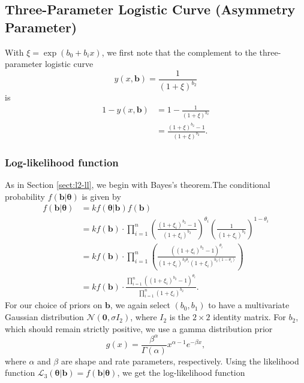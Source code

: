 \documentclass[11pt, letterpaper]{article}
\newcommand{\mc}[1]{\mathcal{#1}}
\numberwithin{equation}{section}
\begin{document}
\subsection{Three-Parameter Logistic Curve (Asymmetry Parameter)}
With $\xi = \exp(b_0 + b_i x)$, we first note that the complement to the three-parameter logistic curve $$y(x, \bm b) = \frac{1}{(1+\xi)^{b_2}} $$ is 
\begin{align*}
1 - y(x, \bm b) & = 1- \frac{1}{(1+\xi)^{b_2}} \\
& = \frac{(1+\xi)^{b_2} -1}{(1+\xi)^{b_2}}.
\end{align*}

\subsubsection{Log-likelihood function}
As in Section \ref{sect:l2-ll}, we begin with Bayes's theorem.The conditional probability $f(\bm b | \bm \theta)$ is given by
\begin{align*}
f(\bm b | \bm \theta) &= k f(\bm \theta | \bm b) f(\bm b) \\
&= k f(\bm b) \cdot \prod_{i=1}^n \left( \frac{(1+\xi_i)^{b_2} - 1}{(1+\xi_i)^{b_2}}\right)^{\theta_i}\left( \frac{1}{(1+\xi_i)^{b_2}}\right)^{1-\theta_i}\\
&= kf(\bm b) \cdot \prod_{i=1}^n \left( \frac{\left((1+\xi_i)^{b_2}-1 \right)^{ \theta_i}}{\left(1+\xi_i\right)^{b_2\theta_i}\left(1+\xi_i\right)^{b_2(1-\theta_i)}}\right)\\
&=k f(\bm b) \cdot  \frac{\prod_{i=1}^n \left( (1+\xi_i)^{b_2}-1 \right)^{\theta_i}}{\prod_{i=1}^n (1+\xi_i)^{b_2}}.
\end{align*}
For our choice of priors on $\bm b$, we again select $(b_0, b_1)$ to have a multivariate Gaussian distribution $\mc N(\bm 0, \sigma I_2)$, where $I_2$ is the $2 \times 2$ identity matrix. For $b_2$, which should remain strictly positive, we use a gamma distribution prior $$ g(x) = \frac{\beta^\alpha}{\Gamma(\alpha)} x^{\alpha-1}e^{-\beta x},$$
where  $\alpha$ and $\beta$ are shape and rate parameters, respectively.
Using the likelihood function $\mc L_3(\bm \theta | \bm b) = f(\bm b | \bm \theta)$, we get the log-likelihood function
\end{document}

